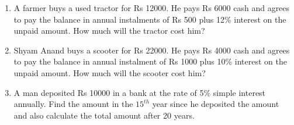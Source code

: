 \begin{enumerate}[label=\thesubsection.\arabic*, ref=\thesubsection.\theenumi]
\item A farmer buys a used tractor for Rs 12000. He pays Rs 6000 cash and agrees to pay the balance in annual instalments of Rs 500 plus 12\% interest on the unpaid amount. How much will the tractor cost him?
\item Shyam Anand buys a scooter for Rs 22000. He pays Rs 4000 cash and agrees to
pay the balance in annual instalment of Rs 1000 plus 10\% interest on the unpaid
amount. How much will the scooter cost him?
\item A man deposited Rs 10000 in a bank at the rate of 5\% simple interest annually. Find the amount in the $15^{th}$ year since he deposited the amount and also calculate the total amount after 20 years.

\end{enumerate}
